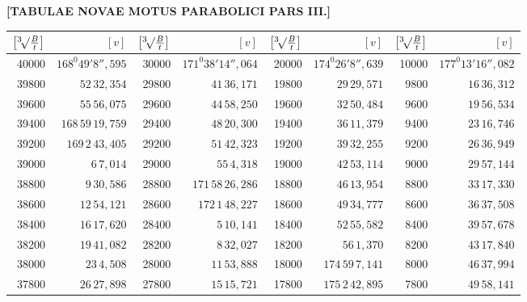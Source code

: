 \clearpage
{}
\begingroup
\centering
\fontsize{9}{9}\selectfont
\setlength{\tabcolsep}{.75pt}
\renewcommand{\arraystretch}{.9}
\setlength{\parskip}{0pt}
\textbf{[TABULAE NOVAE MOTUS PARABOLICI PARS III.]}
\par\vspace{7pt}
\begin{tabular}{|r|r||r|r||r|r||r|r|}
\hline
\rule[-6pt]{0pt}{20pt}\(\bigl[\BareRoot[3]{\frac{B}{t}}\bigr]\) & \([v]\) & \(\bigl[\BareRoot[3]{\frac{B}{t}}\bigr]\) & \([v]\) & \(\bigl[\BareRoot[3]{\frac{B}{t}}\bigr]\) & \([v]\) & \(\bigl[\BareRoot[3]{\frac{B}{t}}\bigr]\) & \([v]\) \\
\hline
40000 & \(168^{0}49'8'',\!595\) & 30000 & \(171^{0}38'14'',\!064\) & 20000 & \(174^{0}26'8'',\!639\) & 10000 & \(177^{0}13'16'',\!082\) \\[1pt]
39800 & \(52\,32,\!354\) & 29800 & \(41\,36,\!171\) & 19800 & \(29\,29,\!571\) & 9800 & \(16\,36,\!312\) \\
39600 & \(55\,56,\!075\) & 29600 & \(44\,58,\!250\) & 19600 & \(32\,50,\!484\) & 9600 & \(19\,56,\!534\) \\
39400 & \(168\,59\,19,\!759\) & 29400 & \(48\,20,\!300\) & 19400 & \(36\,11,\!379\) & 9400 & \(23\,16,\!746\) \\
39200 & \(169\,2\,43,\!405\) & 29200 & \(51\,42,\!323\) & 19200 & \(39\,32,\!255\) & 9200 & \(26\,36,\!949\) \\
39000 & \(6\,7,\!014\) & 29000 & \(55\,4,\!318\) & 19000 & \(42\,53,\!114\) & 9000 & \(29\,57,\!144\) \\[1pt]
38800 & \(9\,30,\!586\) & 28800 & \(171\,58\,26,\!286\) & 18800 & \(46\,13,\!954\) & 8800 & \(33\,17,\!330\) \\
38600 & \(12\,54,\!121\) & 28600 & \(172\,1\,48,\!227\) & 18600 & \(49\,34,\!777\) & 8600 & \(36\,37,\!508\) \\
38400 & \(16\,17,\!620\) & 28400 & \(5\,10,\!141\) & 18400 & \(52\,55,\!582\) & 8400 & \(39\,57,\!678\) \\
38200 & \(19\,41,\!082\) & 28200 & \(8\,32,\!027\) & 18200 & \(56\,1,\!370\) & 8200 & \(43\,17,\!840\) \\
38000 & \(23\,4,\!508\) & 28000 & \(11\,53,\!888\) & 18000 & \(174\,59\,7,\!141\) & 8000 & \(46\,37,\!994\) \\[1pt]
37800 & \(26\,27,\!898\) & 27800 & \(15\,15,\!721\) & 17800 & \(175\,2\,42,\!895\) & 7800 & \(49\,58,\!141\) \\

\end{tabular}
